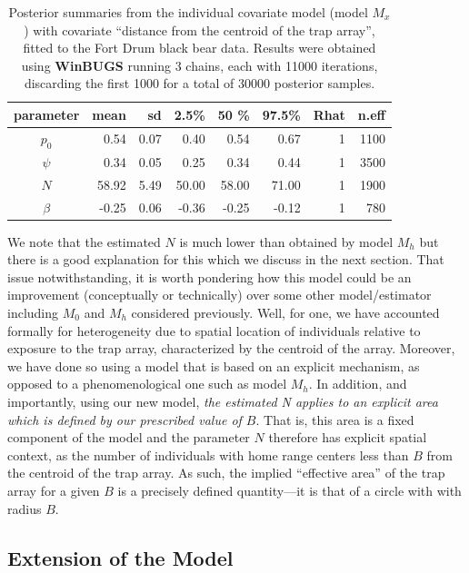 \begin{table}[ht]
  \caption{
    Posterior summaries from the individual covariate model (model
    $M_{x}$) with
    covariate ``distance from the centroid of the trap array'', 
 fitted to the Fort Drum black
    bear data. Results 
    were obtained using {\bf WinBUGS}
    running 3 chains, each with 11000 iterations, discarding the
    first 1000 for a total of 30000 posterior samples. 
}
\begin{tabular}{crrrrrrr} \hline \hline
 parameter &  mean&  sd  &   2.5\% &  50 \%  &   97.5\% &Rhat& n.eff  \\ \hline
$p_0$         &0.54  &0.07  & 0.40   &  0.54  &  0.67  &  1 & 1100  \\
$\psi$        &0.34  &0.05  & 0.25   &  0.34  &  0.44  &  1 & 3500 \\
$N$          &58.92 & 5.49 & 50.00  &  58.00 &  71.00 &   1&  1900 \\
$\beta$       &-0.25 & 0.06 & -0.36  &  -0.25 &  -0.12 &   1&   780 \\ \hline
\end{tabular}
\label{closed.tab.bear2}
\end{table}



We note that the estimated $N$ is much lower than obtained by model
$M_h$ but there is a good explanation for this which we discuss in the
next section.
That issue notwithstanding, it is worth pondering how
this model could be an improvement (conceptually or technically) over
some other model/estimator including $M_0$ and $M_h$ considered
previously. Well, for one, we have accounted formally for
heterogeneity due to spatial location of individuals relative to
exposure to the trap array, characterized by the centroid of the
array. Moreover, we have done so using a model that is based on an
explicit mechanism, as opposed to a phenomenological one such as model
$M_h$. In addition, and importantly, using our new model, {\it the estimated
  N applies to an explicit area which is defined by our prescribed
  value of $B$}. That is, this area is a fixed component of the model
and the parameter $N$ therefore has explicit spatial context, as the
number of individuals with home range centers less than $B$ from the
centroid of the trap array. As such, the implied ``effective area'' of
the trap array for a given $B$ is a precisely defined quantity---it is
that of a circle with with radius $B$.


\subsection{Extension of the Model}

